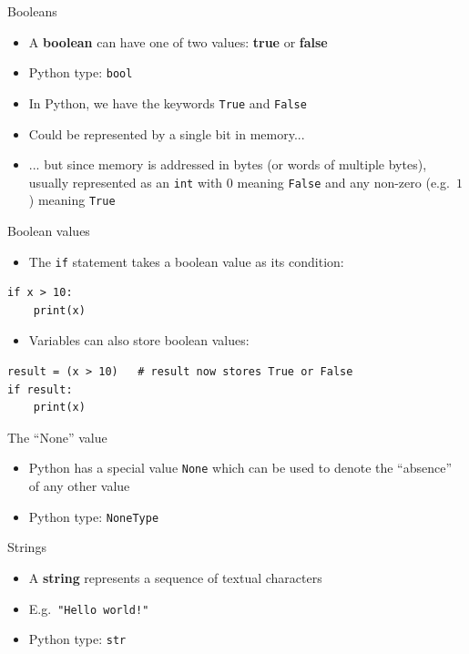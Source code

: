 \begin{frame}{Booleans}
	\begin{itemize}
		\pause\item A \textbf{boolean} can have one of two values: \textbf{true} or \textbf{false}
		\pause\item Python type: \lstinline{bool}
		\pause\item In Python, we have the keywords \lstinline{True} and \lstinline{False}
		\pause\item Could be represented by a single bit in memory...
		\pause\item ... but since memory is addressed in bytes (or words of multiple bytes),
			usually represented as an \lstinline{int} with $0$ meaning \lstinline{False}
			and any non-zero (e.g.\ $1$) meaning \lstinline{True}
	\end{itemize}
\end{frame}

\begin{frame}[fragile]{Boolean values}
	\begin{itemize}
		\pause\item The \lstinline{if} statement takes a boolean value as its condition:
	\end{itemize}
	\begin{lstlisting}
if x > 10:
    print(x)
	\end{lstlisting}
	\begin{itemize}
		\pause\item Variables can also store boolean values:
	\end{itemize}
	\begin{lstlisting}
result = (x > 10)   # result now stores True or False
if result:
    print(x)
	\end{lstlisting}
\end{frame}

\begin{frame}{The ``None'' value}
	\begin{itemize}
		\pause\item Python has a special value \lstinline{None} which can be used to denote the ``absence'' of any other value
		\pause\item Python type: \lstinline{NoneType}
	\end{itemize}
\end{frame}

\begin{frame}{Strings}
	\begin{itemize}
		\pause\item A \textbf{string} represents a sequence of textual characters
		\pause\item E.g.\ \lstinline{"Hello world!"}
		\pause\item Python type: \lstinline{str}
	\end{itemize}
\end{frame}

